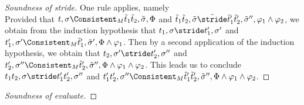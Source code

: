 \begin{proof}[Soundness of stride]
{One rule applies, namely \\
Provided that $t,\sigma\Consistent_M\tilde{t}_1\And \tilde{t}_2,\tilde{\sigma},\Phi$
and $\tilde{t}_1\And \tilde{t}_2,\tilde{\sigma}\tilde{\stride}\tilde{t}'_1\And\tilde{t}'_2,\tilde{\sigma}'',\phi_1\land\phi_2$,
we obtain from the induction hypothesis that $t_1,\sigma\stride t_1',\sigma'$ and $t_1',\sigma'\Consistent_M\tilde{t}_1',\tilde{\sigma}',\Phi\land\phi_1$.
Then by a second application of the induction hypothesis, we obtain that $t_2,\sigma'\stride t_2',\sigma''$ and $t_2',\sigma''\Consistent_M\tilde{t}_2',\tilde{\sigma}'',\Phi\land\phi_1\land\phi_2$.
This leads us to conclude $t_1\And t_2,\sigma\stride t_1'\And t_2',\sigma''$ and $t_1'\And t_2',\sigma''\Consistent_M\tilde{t}_1'\And\tilde{t}_2',\tilde{\sigma}'',\Phi\land\phi_1\land\phi_2$.

}

\end{proof}

\begin{proof}[Soundness of evaluate]

\end{proof}
